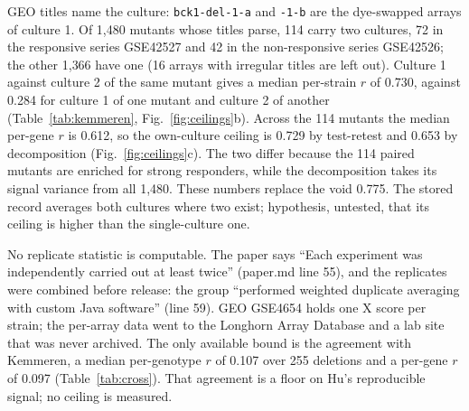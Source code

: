 GEO titles name the culture: \texttt{bck1-del-1-a} and \texttt{-1-b} are the
dye-swapped arrays of culture 1. Of 1{,}480 mutants whose titles parse, 114 carry two
cultures, 72 in the responsive series GSE42527 and 42 in the non-responsive series
GSE42526; the other 1{,}366 have one (16 arrays with irregular titles are left out).
Culture 1 against culture 2 of the same mutant gives a median per-strain $r$ of 0.730,
against 0.284 for culture 1 of one mutant and culture 2 of another
(Table~\ref{tab:kemmeren}, Fig.~\ref{fig:ceilings}b). Across the 114 mutants the median
per-gene $r$ is 0.612, so the own-culture ceiling is 0.729 by test-retest and 0.653 by
decomposition (Fig.~\ref{fig:ceilings}c). The two differ because the 114 paired mutants
are enriched for strong responders, while the decomposition takes its signal variance
from all 1{,}480. These numbers replace the void 0.775. The stored record averages both
cultures where two exist; hypothesis, untested, that its ceiling is higher than the
single-culture one.

\begin{table}[htbp]
\centering
\footnotesize
\caption[]{\textbf{Kemmeren 2014, culture 1 against culture 2.} A culture's profile is the
mean over its dye-swapped arrays of the within-array $\log_2$(deletion/reference pool),
computed by the loader's own functions from the GEO arrays of GSE42527 and GSE42526. The
null pairs culture 1 of one mutant with culture 2 of another. Per-gene ceilings average
over genes with at least three paired mutants; the decomposition takes the noise variance
from the paired cultures and the total variance from the first culture of every mutant.}
\label{tab:kemmeren}

\end{table}

No replicate statistic is computable. The paper says ``Each experiment was
independently carried out at least twice'' (paper.md line 55), and the replicates were
combined before release: the group ``performed weighted duplicate averaging with custom
Java software'' (line 59). GEO GSE4654 holds one X score per strain; the per-array data
went to the Longhorn Array Database and a lab site that was never archived. The only
available bound is the agreement with Kemmeren, a median per-genotype $r$ of 0.107 over
255 deletions and a per-gene $r$ of 0.097 (Table~\ref{tab:cross}). That agreement is a floor on Hu's reproducible signal;
no ceiling is measured.

